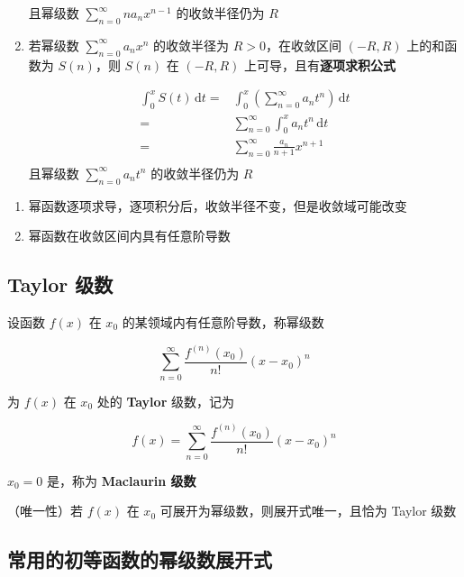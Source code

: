 \documentclass[lang = zh , final , oneside , openany , titlepage , zihao = -4 , linespread = 1.3 , baselineskip = false , cjk-font = windows , text-font = newtx , math-font = newtx]{sjtureport}
\begin{document}
\begin{definition}
\begin{enumerate}
且幂级数 \(\displaystyle \sum_{n=0}^\infty na_nx^{n-1}\) 的收敛半径仍为
\(R\)

    \item 若幂级数 \(\displaystyle \sum_{n=0}^\infty a_nx^n\) 的收敛半径为
\(R>0\)，在收敛区间 \((-R,R)\) 上的和函数为 \(S(n)\)，则 \(S(n)\) 在
\((-R,R)\) 上可导，且有\textbf{逐项求积公式}

\[\begin{aligned}
\int_0^xS(t)\,\mathrm{d}t = &\int_0^x\left(\sum_{n=0}^\infty a_nt^n\right)\,\mathrm{d}t\\
  = &\sum_{n=0}^\infty \int_0^x a_nt^n\,\mathrm{d}t\\
  = &\sum_{n=0}^\infty \frac{a_n}{n+1}x^{n+1}\\
\end{aligned}
\]
且幂级数 \(\displaystyle \sum_{n=0}^\infty a_nt^n\) 的收敛半径仍为 \(R\)
\end{enumerate}

\begin{remark}
    \begin{enumerate}
\item
  幂函数逐项求导，逐项积分后，收敛半径不变，但是收敛域可能改变
\item
  幂函数在收敛区间内具有任意阶导数
\end{enumerate}
\end{remark}

\subsection{Taylor 级数}

\begin{definition}
    设函数 \(f(x)\) 在 \(x_0\) 的某领域内有任意阶导数，称幂级数

\[\sum_{n=0}^\infty \frac{f^{(n)}(x_0)}{n!}(x-x_0)^n\]

为 \(f(x)\) 在 \(x_0\) 处的 \textbf{Taylor} 级数，记为

\[f(x) = \sum_{n=0}^\infty \frac{f^{(n)}(x_0)}{n!}(x-x_0)^n\]

\(x_0=0\) 是，称为 \textbf{Maclaurin 级数}
\end{definition}

\begin{theorem}
    （唯一性）若 \(f(x)\) 在 \(x_0\) 可展开为幂级数，则展开式唯一，且恰为 Taylor 级数
\end{theorem}

\subsection{常用的初等函数的幂级数展开式}


\end{definition}
\end{document}
